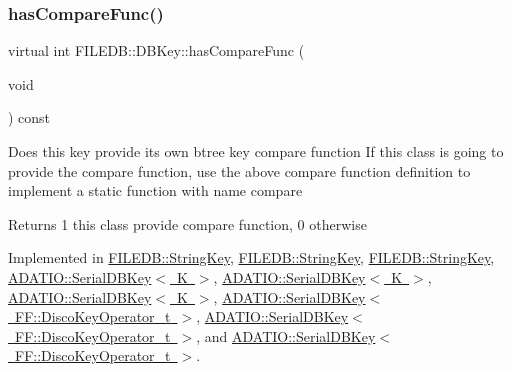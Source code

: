 \mbox{\label{classFILEDB_1_1DBKey_a416c32ba10caf76e6b7ff4986cfc3c05}} 
\subsubsection{\texorpdfstring{hasCompareFunc()}{hasCompareFunc()}\hspace{0.1cm}{\footnotesize\ttfamily [2/3]}}
{\footnotesize\ttfamily virtual int F\+I\+L\+E\+D\+B\+::\+D\+B\+Key\+::has\+Compare\+Func (\begin{DoxyParamCaption}\item[{void}]{ }\end{DoxyParamCaption}) const\hspace{0.3cm}{\ttfamily [pure virtual]}}

Does this key provide its own btree key compare function If this class is going to provide the compare function, use the above compare function definition to implement a static function with name compare

\begin{DoxyReturn}{Returns}
1 this class provide compare function, 0 otherwise 
\end{DoxyReturn}


Implemented in \mbox{\hyperlink{classFILEDB_1_1StringKey_a430c4d6d22db7160c501c1703f9f13cf}{F\+I\+L\+E\+D\+B\+::\+String\+Key}}, \mbox{\hyperlink{classFILEDB_1_1StringKey_a430c4d6d22db7160c501c1703f9f13cf}{F\+I\+L\+E\+D\+B\+::\+String\+Key}}, \mbox{\hyperlink{classFILEDB_1_1StringKey_a430c4d6d22db7160c501c1703f9f13cf}{F\+I\+L\+E\+D\+B\+::\+String\+Key}}, \mbox{\hyperlink{classADATIO_1_1SerialDBKey_a2f28d2ac39919d9cb9f6fc097944c49c}{A\+D\+A\+T\+I\+O\+::\+Serial\+D\+B\+Key$<$ K $>$}}, \mbox{\hyperlink{classADATIO_1_1SerialDBKey_a2f28d2ac39919d9cb9f6fc097944c49c}{A\+D\+A\+T\+I\+O\+::\+Serial\+D\+B\+Key$<$ K $>$}}, \mbox{\hyperlink{classADATIO_1_1SerialDBKey_a2f28d2ac39919d9cb9f6fc097944c49c}{A\+D\+A\+T\+I\+O\+::\+Serial\+D\+B\+Key$<$ K $>$}}, \mbox{\hyperlink{classADATIO_1_1SerialDBKey_a2f28d2ac39919d9cb9f6fc097944c49c}{A\+D\+A\+T\+I\+O\+::\+Serial\+D\+B\+Key$<$ F\+F\+::\+Disco\+Key\+Operator\+\_\+t $>$}}, \mbox{\hyperlink{classADATIO_1_1SerialDBKey_a2f28d2ac39919d9cb9f6fc097944c49c}{A\+D\+A\+T\+I\+O\+::\+Serial\+D\+B\+Key$<$ F\+F\+::\+Disco\+Key\+Operator\+\_\+t $>$}}, and \mbox{\hyperlink{classADATIO_1_1SerialDBKey_a2f28d2ac39919d9cb9f6fc097944c49c}{A\+D\+A\+T\+I\+O\+::\+Serial\+D\+B\+Key$<$ F\+F\+::\+Disco\+Key\+Operator\+\_\+t $>$}}.

